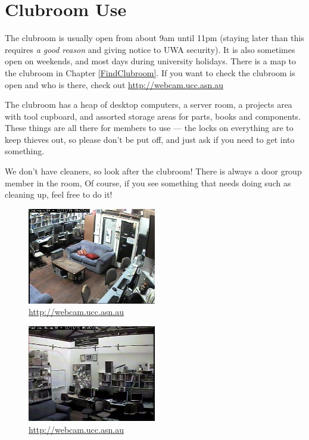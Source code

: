 \chapter{Clubroom Use}

\begin{mdframed}

The clubroom is usually open from about 9am until 11pm (staying later than this requires \emph{a good reason} and giving notice to UWA security). It is also sometimes open on weekends, and most days during university holidays. There is a map to the clubroom in Chapter \ref{FindClubroom}. If you want to check the clubroom is open and who is there, check out \url{http://webcam.ucc.asn.au}

The clubroom has a heap of desktop computers, a server room, a projects area with tool cupboard, and assorted storage areas for parts, books and components. These things are all there for members to use --- the locks on everything are to keep thieves out, so please don't be put off, and just ask if you need to get into something.

We don't have cleaners, so look after the clubroom! There is always a door group member in the room,  Of course, if you see something that needs doing such as cleaning up, feel free to do it!

\begin{figure}[H]
	\centering
	\includegraphics[width=0.5\textwidth]{figures/webcam.jpg}
	\caption{\url{http://webcam.ucc.asn.au}}
	\label{webcam.jpg}
\end{figure}

\begin{figure}[H]
	\centering
	\includegraphics[width=0.5\textwidth]{figures/webcam2.jpg}
	\caption{\url{http://webcam.ucc.asn.au}}
	\label{webcam2.jpg}
\end{figure}

\end{mdframed}
